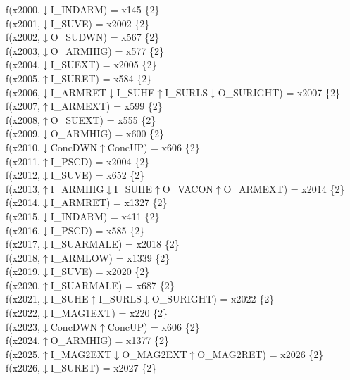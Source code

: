 f(x2000,$\downarrow$I\_INDARM) = x145 \{2\} \\  
f(x2001,$\downarrow$I\_SUVE) = x2002 \{2\} \\  
f(x2002,$\downarrow$O\_SUDWN) = x567 \{2\} \\  
f(x2003,$\downarrow$O\_ARMHIG) = x577 \{2\} \\  
f(x2004,$\downarrow$I\_SUEXT) = x2005 \{2\} \\  
f(x2005,$\uparrow$I\_SURET) = x584 \{2\} \\  
f(x2006,$\downarrow$I\_ARMRET$\downarrow$I\_SUHE$\uparrow$I\_SURLS$\downarrow$O\_SURIGHT) = x2007 \{2\} \\  
f(x2007,$\uparrow$I\_ARMEXT) = x599 \{2\} \\  
f(x2008,$\uparrow$O\_SUEXT) = x555 \{2\} \\  
f(x2009,$\downarrow$O\_ARMHIG) = x600 \{2\} \\  
f(x2010,$\downarrow$ConcDWN$\uparrow$ConcUP) = x606 \{2\} \\  
f(x2011,$\uparrow$I\_PSCD) = x2004 \{2\} \\  
f(x2012,$\downarrow$I\_SUVE) = x652 \{2\} \\  
f(x2013,$\uparrow$I\_ARMHIG$\downarrow$I\_SUHE$\uparrow$O\_VACON$\uparrow$O\_ARMEXT) = x2014 \{2\} \\  
f(x2014,$\downarrow$I\_ARMRET) = x1327 \{2\} \\  
f(x2015,$\downarrow$I\_INDARM) = x411 \{2\} \\  
f(x2016,$\downarrow$I\_PSCD) = x585 \{2\} \\  
f(x2017,$\downarrow$I\_SUARMALE) = x2018 \{2\} \\  
f(x2018,$\uparrow$I\_ARMLOW) = x1339 \{2\} \\  
f(x2019,$\downarrow$I\_SUVE) = x2020 \{2\} \\  
f(x2020,$\uparrow$I\_SUARMALE) = x687 \{2\} \\  
f(x2021,$\downarrow$I\_SUHE$\uparrow$I\_SURLS$\downarrow$O\_SURIGHT) = x2022 \{2\} \\  
f(x2022,$\downarrow$I\_MAG1EXT) = x220 \{2\} \\  
f(x2023,$\downarrow$ConcDWN$\uparrow$ConcUP) = x606 \{2\} \\  
f(x2024,$\uparrow$O\_ARMHIG) = x1377 \{2\} \\  
f(x2025,$\uparrow$I\_MAG2EXT$\downarrow$O\_MAG2EXT$\uparrow$O\_MAG2RET) = x2026 \{2\} \\  
f(x2026,$\downarrow$I\_SURET) = x2027 \{2\} \\  
